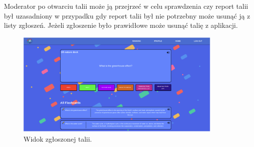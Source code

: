 Moderator po otwarciu talii może ją przejrzeć w celu sprawdzenia czy report talii był uzasadniony w przypadku gdy report talii był nie potrzebny może usunąć ją z listy zgłoszeń. Jeżeli zgłoszenie było prawidłowe może usunąć talię z aplikacji.


\begin{figure}[H]
    \centering
    \includegraphics[width=0.9\textwidth]{chapters/chapter_10/images_web/web_reported_deck_2}
    \caption{Widok zgłoszonej talii.}
    \label{img:web_reported_deck_2}
\end{figure}
